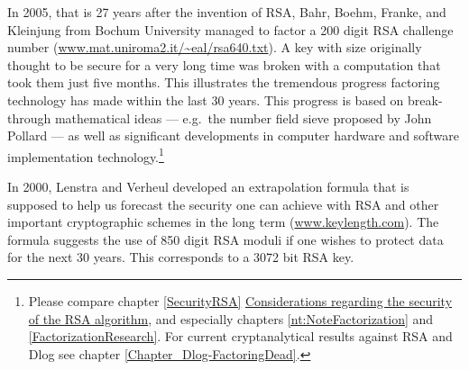 \begin{bibunit}[babalpha]
In 2005, that is 27 years after the invention of
RSA, Bahr, Boehm, Franke, and Kleinjung from
Bochum University managed to factor a 200 digit
RSA challenge number
(\url{www.mat.uniroma2.it/~eal/rsa640.txt}).  A
key with size originally thought to be secure for
a very long time was broken with a computation
that took them just five months.  This illustrates
the tremendous progress factoring technology has
made within the last 30 years.  This progress is
based on break-through mathematical ideas --- e.g.\
the number field sieve proposed by John
Pollard --- as well as significant developments in
computer hardware and software implementation
technology.\footnote{%
Please compare chapter \ref{SecurityRSA}
\hyperlink{SecurityRSA}{Considerations regarding the
security of the RSA algorithm}, and especially chapters
\ref{nt:NoteFactorization} and \ref{FactorizationResearch}.
For current cryptanalytical results against RSA and Dlog
see chapter \ref{Chapter_Dlog-FactoringDead}.
}

In 2000, Lenstra and Verheul
developed an extrapolation formula that is supposed
to help us forecast the security
one can achieve with RSA and other important
cryptographic schemes in the long
term (\url{www.keylength.com}).  The formula
suggests the use of 850 digit RSA moduli if one
wishes to protect data for the next 30 years.
This corresponds to a 3072 bit RSA key.


\end{bibunit}
